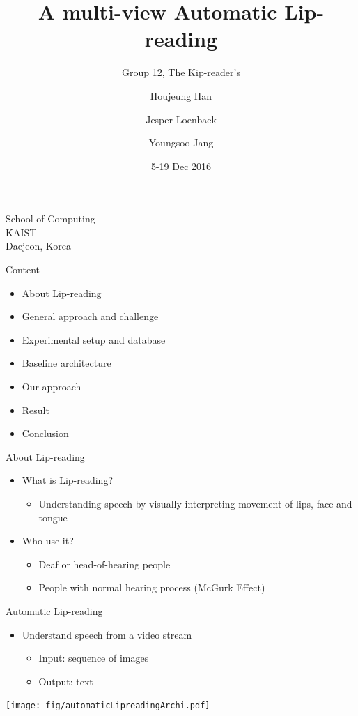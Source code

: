 \documentclass[xcolor=table]{beamer}
\begin{document}
\title{A multi-view Automatic Lip-reading}
\subtitle{Group 12, The Kip-reader's}
\author{Houjeung Han \and Jesper Loenbaek \and Youngsoo Jang}
\institute%
{
    School of Computing\\
    KAIST\\
    Daejeon, Korea
}

\date{5-19 Dec 2016}
\frame{\titlepage}

\begin{frame}{Content}
    \begin{itemize}
        \item About Lip-reading
        \item General approach and challenge
        \item Experimental setup and database
        \item Baseline architecture
        \item Our approach
        \item Result 
        \item Conclusion 
    \end{itemize}
\end{frame}

\begin{frame}{About Lip-reading}
    \begin{itemize}
        \item What is Lip-reading?
        \begin{itemize}
            \item Understanding speech by visually interpreting movement of lips, face and tongue
        \end{itemize}
    \end{itemize}
    \begin{itemize}
        \item Who use it?
        \begin{itemize}
            \item Deaf or head-of-hearing people
            \item People with normal hearing process (McGurk Effect)
        \end{itemize}
    \end{itemize}
\end{frame}

\begin{frame}{Automatic Lip-reading}
    \begin{itemize}
        \item Understand speech from a video stream
        \begin{itemize}
            \item Input: sequence of images
            \item Output: text 
        \end{itemize}
    \end{itemize}
    \begin{center}
    \texttt{[image: fig/automaticLipreadingArchi.pdf]}   
    \end{center}
\end{frame}
\end{document}
